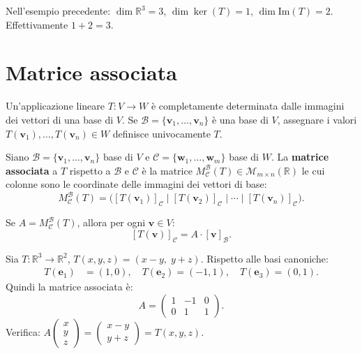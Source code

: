 \begin{examplebox}
Nell'esempio precedente: $\dim\mathbb{R}^3 = 3$, $\dim\ker(T) = 1$, $\dim\text{Im}(T) = 2$. Effettivamente $1 + 2 = 3$.
\end{examplebox}

\section{Matrice associata}
\label{sec:matrice-associata}

\begin{theorembox}
\label{thm:determinazione-base}
Un'applicazione lineare $T \colon V \to W$ è completamente determinata dalle immagini dei vettori di una base di $V$. Se $\mathcal{B} = \{\mathbf{v}_1, \ldots, \mathbf{v}_n\}$ è una base di $V$, assegnare i valori $T(\mathbf{v}_1), \ldots, T(\mathbf{v}_n) \in W$ definisce univocamente $T$.
\end{theorembox}

\begin{definitionbox}
Siano $\mathcal{B} = \{\mathbf{v}_1, \ldots, \mathbf{v}_n\}$ base di $V$ e $\mathcal{C} = \{\mathbf{w}_1, \ldots, \mathbf{w}_m\}$ base di $W$. La \textbf{matrice associata} a $T$ rispetto a $\mathcal{B}$ e $\mathcal{C}$ è la matrice $M_{\mathcal{C}}^{\mathcal{B}}(T) \in \mathcal{M}_{m \times n}(\mathbb{R})$ le cui colonne sono le coordinate delle immagini dei vettori di base:
\[ M_{\mathcal{C}}^{\mathcal{B}}(T) = \Big( [T(\mathbf{v}_1)]_{\mathcal{C}} \;\Big|\; [T(\mathbf{v}_2)]_{\mathcal{C}} \;\Big|\; \cdots \;\Big|\; [T(\mathbf{v}_n)]_{\mathcal{C}} \Big). \]
\end{definitionbox}

\begin{theorembox}
Se $A = M_{\mathcal{C}}^{\mathcal{B}}(T)$, allora per ogni $\mathbf{v} \in V$:
\[ [T(\mathbf{v})]_{\mathcal{C}} = A \cdot [\mathbf{v}]_{\mathcal{B}}. \]
\end{theorembox}

\begin{examplebox}
Sia $T \colon \mathbb{R}^3 \to \mathbb{R}^2$, $T(x,y,z) = (x - y, \; y + z)$. Rispetto alle basi canoniche:
\begin{align*}
    T(\mathbf{e}_1) &= (1, 0), \quad T(\mathbf{e}_2) = (-1, 1), \quad T(\mathbf{e}_3) = (0, 1).
\end{align*}
Quindi la matrice associata è:
\[ A = \begin{pmatrix} 1 & -1 & 0 \\ 0 & 1 & 1 \end{pmatrix}. \]
Verifica: $A \begin{pmatrix} x \\ y \\ z \end{pmatrix} = \begin{pmatrix} x - y \\ y + z \end{pmatrix} = T(x,y,z)$.
\end{examplebox}

